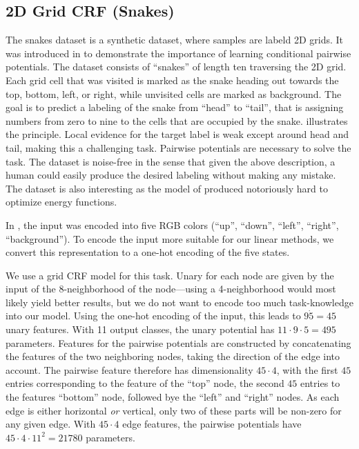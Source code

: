 \subsection{2D Grid CRF (Snakes)}
The snakes dataset is a synthetic dataset, where samples are labeld 2D grids.
It was introduced in \citet{nowozin2011decision} to demonstrate the importance
of learning conditional pairwise potentials. The dataset consists of ``snakes''
of length ten traversing the 2D grid. Each grid cell that was visited is marked
as the snake heading out towards the top, bottom, left, or right, while
unvisited cells are marked as background.  The goal is to predict a labeling of
the snake from ``head'' to ``tail'', that is assigning numbers from zero to
nine to the cells that are occupied by the snake.   illustrates the
principle.
Local evidence for the target label is weak except
around head and tail, making this a challenging task. Pairwise potentials are necessary to solve the
task. The dataset is noise-free in the sense that given the above description, a
human could easily produce the desired labeling without making any mistake.
The dataset is also interesting as the model of \citet{nowozin2011decision} produced
notoriously hard to optimize energy functions.

In \citet{nowozin2011decision}, the input was encoded into five RGB colors
(``up'', ``down'', ``left'', ``right'', ``background'').  To encode the input
more suitable for our linear methods, we convert this representation to a
one-hot encoding of the five states.

We use a grid CRF model for this task. Unary for each node are given by the
input of the 8-neighborhood of the node---using a 4-neighborhood would most
likely yield better results, but we do not want to encode too much
task-knowledge into our model.
Using the one-hot encoding of the input, this leads to $9 \dot 5 = 45$ unary features.
With 11 output classes, the unary potential has $11 \cdot 9 \cdot 5=495$ parameters.
Features for the pairwise potentials are constructed by concatenating the features
of the two neighboring nodes, taking the direction of the edge into account.
The pairwise feature therefore has dimensionality $45 \cdot 4$, with the first
$45$ entries corresponding to the feature of the ``top'' node, the second $45$
entries to the features ``bottom'' node, followed bye the ``left'' and
``right'' nodes. As each edge is either horizontal \emph{or} vertical, only two
of these parts will be non-zero for any given edge.  With $45 \cdot 4$ edge
features, the pairwise potentials have $45 \cdot 4 \cdot 11^2 =21780$ parameters.


